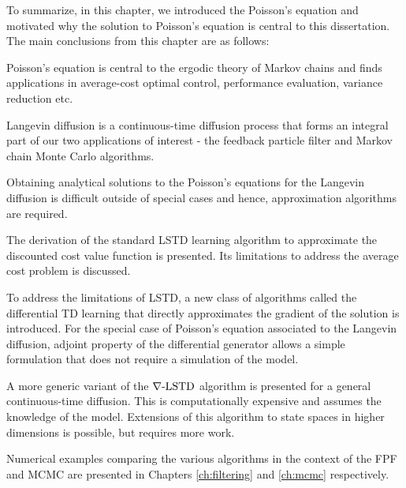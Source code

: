 To summarize, in this chapter, we introduced the Poisson's equation and motivated why the solution to Poisson's equation is central to this dissertation. The main conclusions from this chapter are as follows:
\begin{romannum}
	\item Poisson's equation is central to the ergodic theory of Markov chains and finds applications in average-cost optimal control, performance evaluation, variance reduction etc. 
	\item Langevin diffusion is a continuous-time diffusion process that forms an integral part of our two applications of interest - the feedback particle filter and Markov chain Monte Carlo algorithms. 
	\item Obtaining analytical solutions to the Poisson's equations for the Langevin diffusion is difficult outside of special cases and hence, approximation algorithms are required. 
	\item The derivation of the standard LSTD learning algorithm to approximate the discounted cost value function is presented. Its limitations to address the average cost problem is discussed.
	\item To address the limitations of LSTD, a new class of algorithms called the differential TD learning that directly approximates the gradient of the solution is introduced.  For the special case of Poisson's equation associated to the Langevin diffusion, adjoint property of the differential generator allows a simple formulation that does not require a simulation of the model.
	\item A more generic variant of the $\nabla\text{-LSTD}$ algorithm is presented for a general continuous-time diffusion. This is computationally expensive and assumes the knowledge of the model. Extensions of this algorithm to state spaces in higher dimensions is possible, but requires more work. 
	\item  Numerical examples comparing the various algorithms in the context of the FPF and MCMC are presented in Chapters \ref{ch:filtering} and \ref{ch:mcmc} respectively. 
\end{romannum}




